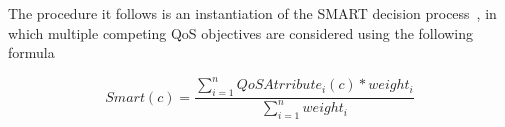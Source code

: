 

The procedure it follows is an instantiation of the SMART decision process~\cite{Olson1996}, in which multiple competing QoS objectives are considered using the following formula

\begin{equation}
Smart(c) = \frac{\sum_{i=1}^{n} QoSAtrribute_i(c)*weight_i}{\sum_{i=1}^{n}weight_i} \label{eq:smart}
\end{equation}

